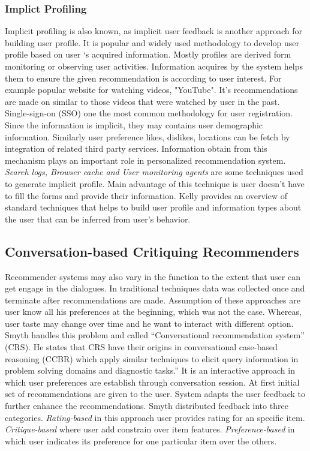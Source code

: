 \subsubsection{Implict Profiling}

Implicit profiling is also known, as implicit user feedback is another approach for building user profile. It is popular and widely used methodology to develop user profile based on user ‘s acquired information. Mostly profiles are derived form monitoring or observing user activities.  Information acquires by the system helps them to ensure the given recommendation is according to user interest. For example popular website for watching videos, "YouTube". It's recommendations are made on similar to those videos that were watched by user in the past. Single-sign-on (SSO) one the most common methodology for user registration. Since the information is implicit, they may contains user demographic information. Similarly user preference likes, dislikes, locations can be fetch by integration of related third party services. Information obtain from this mechanism plays an important role in personalized recommendation system. \textit{Search logs, Browser cache and User monitoring agents} are some techniques used to generate implicit profile. Main advantage of this technique is user doesn’t have to fill the forms and provide their information. Kelly \cite{schiaffino2009intelligent} provides an overview of standard techniques that helps to build user profile and information types about the user that can be inferred from user’s behavior.\newline

\subsection{Conversation-based Critiquing Recommenders}

Recommender systems may also vary in the function to the extent that user can get engage in the dialogues. In traditional techniques data was collected once and terminate after recommendations are made. Assumption of these approaches are user know all his preferences at the beginning, which was not the case. Whereas, user taste may change over time and he want to interact with different option. Smyth \cite{ mcginty2003role} handles this problem and called “Conversational recommendation system” (CRS). He states that CRS have their origins in conversational case-based reasoning (CCBR) which apply similar techniques to elicit query information in problem solving domains and diagnostic tasks.” It is an interactive approach in which user preferences are establish through conversation session. At first initial set of recommendations are given to the user. System adapts the user feedback to further enhance the recommendations. Smyth \cite{ mcginty2003role} distributed feedback into three categories.\textit{ Rating-based} in this approach user provides rating for an specific item.\textit{ Critique-based} where user add constrain over item features.\textit{ Preference-based } in which user indicates its preference for one particular item over the others.\newline

